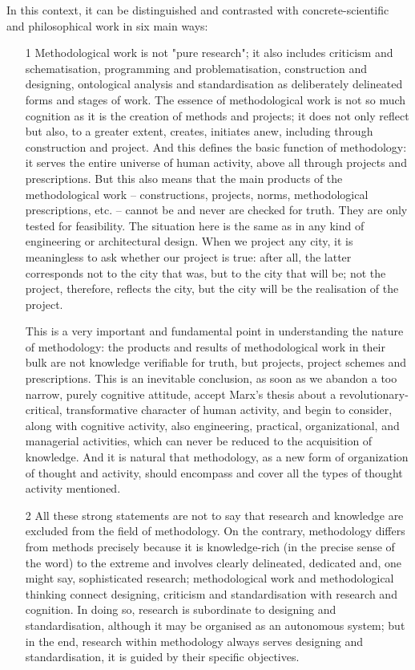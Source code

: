 \documentclass[11pt,a4paper]{article}
\begin{document}
In this context, it can be distinguished and contrasted with
concrete-scientific and philosophical work in six main ways:
\begin{itemize}
\item[1] Methodological work is not "pure research"; it also includes
  criticism and schematisation, programming and problematisation, construction
  and designing, ontological analysis and standardisation as deliberately
  delineated forms and stages of work. The essence of methodological work is
  not so much cognition as it is the creation of methods and projects; it does
  not only reflect but also, to a greater extent, creates, initiates anew,
  including through construction and project. And this defines the basic
  function of methodology: it serves the entire universe of human activity,
  above all through projects and prescriptions. But this also means that the
  main products of the methodological work – constructions, projects, norms,
  methodological prescriptions, etc. – cannot be and never are checked for
  truth. They are only tested for feasibility. The situation here is the same
  as in any kind of engineering or architectural design. When we project any
  city, it is meaningless to ask whether our project is true: after all, the
  latter corresponds not to the city that was, but to the city that will be;
  not the project, therefore, reflects the city, but the city will be the
  realisation of the project.
  
  This is a very important and fundamental point in understanding the nature
  of methodology: the products and results of methodological work in their
  bulk are not knowledge verifiable for truth, but projects, project schemes
  and prescriptions. This is an inevitable conclusion, as soon as we abandon a
  too narrow, purely cognitive attitude, accept Marx's thesis about a
  revolutionary-critical, transformative character of human activity, and
  begin to consider, along with cognitive activity, also engineering,
  practical, organizational, and managerial activities, which can never be
  reduced to the acquisition of knowledge. And it is natural that methodology,
  as a new form of organization of thought and activity, should encompass and
  cover all the types of thought activity mentioned.
  
\item[2] All these strong statements are not to say that research and
  knowledge are excluded from the field of methodology. On the contrary,
  methodology differs from methods precisely because it is knowledge-rich (in
  the precise sense of the word) to the extreme and involves clearly
  delineated, dedicated and, one might say, sophisticated research;
  methodological work and methodological thinking connect designing, criticism
  and standardisation with research and cognition. In doing so, research is
  subordinate to designing and standardisation, although it may be organised
  as an autonomous system; but in the end, research within methodology always
  serves designing and standardisation, it is guided by their specific
  objectives.
  

\end{itemize}
\end{document}
